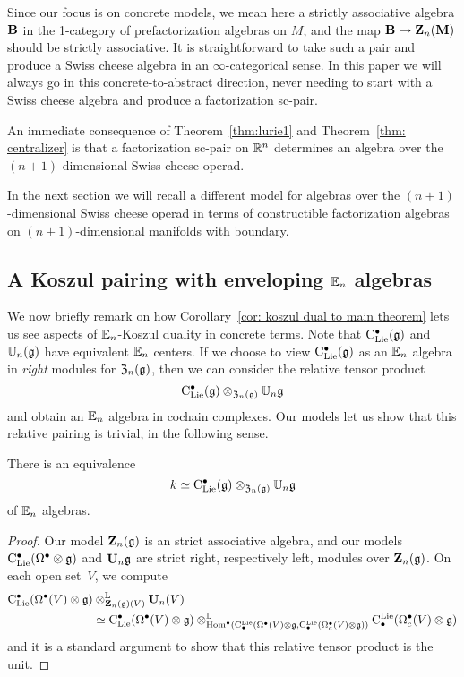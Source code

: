 \documentclass[11pt]{amsart}
\numberwithin{equation}{section}
\begin{document}
\begin{rmk}
Since our focus is on concrete models, we mean here a strictly associative algebra $\mathbf B$ in the 1-category of prefactorization algebras on $M$,
and the map $\mathbf B \to \mathbf Z_n(\mathbf M)$ should be strictly associative.
It is straightforward to take such a pair and produce a Swiss cheese algebra in an $\infty$-categorical sense.
In this paper we will always go in this concrete-to-abstract direction,
never needing to start with a Swiss cheese algebra and produce a factorization sc-pair.
\end{rmk}

An immediate consequence of Theorem~\ref{thm:lurie1} and Theorem~\ref{thm: centralizer} is that a factorization sc-pair on $\mathbb R^n$ determines an algebra over the $(n+1)$-dimensional Swiss cheese operad. 

In the next section we will recall a different model for algebras over the $(n+1)$-dimensional Swiss cheese operad in terms of constructible factorization algebras on $(n+1)$-dimensional manifolds with boundary. 

\subsection{A Koszul pairing with enveloping $\mathbb E_n$ algebras}

We now briefly remark on how Corollary~\ref{cor: koszul dual to main theorem} lets us see aspects of $\mathbb E_n$-Koszul duality in concrete terms.
Note that ${\rm C}_{\rm Lie}^\bullet(\mathfrak g)$ and $\mathbb U_n(\mathfrak g)$ have equivalent $\mathbb E_n$ centers.
If we choose to view ${\rm C}_{\rm Lie}^\bullet(\mathfrak g)$ as an $\mathbb E_n$ algebra in {\em right} modules for ${\frak Z}_n(\mathfrak g)$,
then we can consider the relative tensor product
\[
{\rm C}_{\rm Lie}^\bullet(\mathfrak g) \otimes_{{\frak Z}_n(\mathfrak g)} \mathbb U_n \mathfrak g
\]
and obtain an $\mathbb E_n$ algebra in cochain complexes.
Our models let us show that this relative pairing is trivial, in the following sense.

\begin{lmm}
There is an equivalence  
\[
k \simeq {\rm C}_{\rm Lie}^\bullet(\mathfrak g) \otimes_{{\frak Z}_n(\mathfrak g)} \mathbb U_n \mathfrak g
\]
of $\mathbb E_n$ algebras.
\end{lmm}

\begin{proof}
Our model $\mathbf Z_n(\mathfrak g)$ is an strict associative algebra, and our models ${\rm C}_{\rm Lie}^\bullet(\Omega^\bullet \otimes \mathfrak g)$ and $\mathbf U_n\mathfrak g$ are strict right, respectively left, modules over $\mathbf Z_n(\mathfrak g)$.
On each open set~$V$, we compute
\begin{align*}
{\rm C}_{\rm Lie}^\bullet(\Omega^\bullet(V) \otimes \mathfrak g) &\otimes^\mathbb L_{\mathbf Z_n(\mathfrak g)(V)} \mathbf U_n(V) \\
&\simeq {\rm C}_{\rm Lie}^\bullet(\Omega^\bullet(V) \otimes \mathfrak g) \otimes^\mathbb L_{{\rm Hom}^\bullet({\rm C}^{\rm Lie}_\bullet(\Omega^\bullet(V) \otimes \mathfrak g, {\rm C}^{\rm Lie}_\bullet(\Omega^\bullet_c(V)\otimes \mathfrak g))} {\rm C}^{\rm Lie}_\bullet(\Omega^\bullet_c(V)\otimes \mathfrak g)
\end{align*}
and it is a standard argument to show that this relative tensor product is the unit.
\end{proof}
\end{document}
